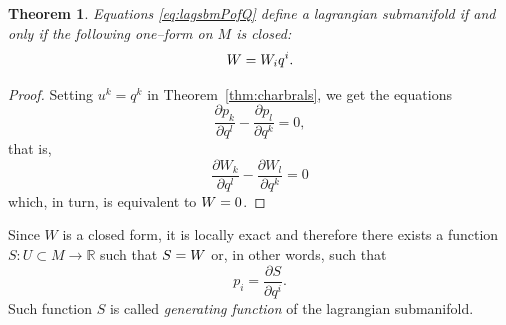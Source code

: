 \documentclass[english,fontsize=11pt,paper=a5,oneside]{scrbook}
\newcommand{\R}{\mathbb{R}}
\let\d\relax
\DeclareMathOperator{\d}{d}
\newtheorem{theorem}{Theorem}[chapter]
\theoremstyle{definition}
\begin{document}
\begin{theorem}\label{thm:lsoform}
    Equations \eqref{eq:lagsbmPofQ} define a lagrangian submanifold if and only if the following one--form on $M$ is closed:
    \begin{equation}
        W = W_i \d q^i.
    \end{equation}
\end{theorem}
\begin{proof}
    Setting $u^k = q^k$ in Theorem~\ref{thm:charbrals}, we get the equations
    \begin{equation}
        \frac{\partial p_k}{\partial q^l} - \frac{\partial p_l}{\partial q^k} = 0,
    \end{equation}
    that is,
    \begin{equation}
        \frac{\partial W_k}{\partial q^l} - \frac{\partial W_l}{\partial q^k} = 0
    \end{equation}
    which, in turn, is equivalent to $\d W = 0$.
\end{proof}

Since $W$ is a closed form, it is locally exact and therefore there exists a function $S: U \subset M \to \R$ such that $\d S = W$ or, in other words, such that
\begin{equation}
    p_i = \frac{\partial S}{\partial q^i}.
\end{equation}
Such function $S$ is called \emph{generating function} of the lagrangian submanifold.
\end{document}
